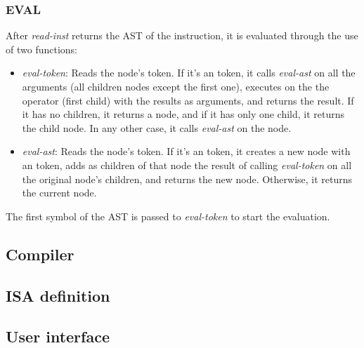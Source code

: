 \subsubsection{EVAL}\label{subsubsec:eval}
After \textit{read-inst} returns the \gls{AST} of the instruction, it is evaluated through the use of two functions:
\begin{itemize}
  \item \textit{eval-token}: Reads the node's token. If it's an  token, it calls \textit{eval-ast} on all the arguments (all children nodes except the first one), executes on the  the operator (first child) with the results as arguments, and returns the result. If it has no children, it returns a  node, and if it has only one child, it returns the child node. In any other case, it calls \textit{eval-ast} on the node.
  \item \textit{eval-ast}: Reads the node's token. If it's an  token, it creates a new node with an  token, adds as children of that node the result of calling \textit{eval-token} on all the original node's children, and returns the new node. Otherwise, it returns the current node.
\end{itemize}

\noindent
The first symbol of the \gls{AST} is passed to \textit{eval-token} to start the evaluation.


\subsection{Compiler}\label{subsec:compiler-design}



\subsection{ISA definition}\label{subsec:isa-design}


\subsection{User interface}\label{subsec:ui-design}


